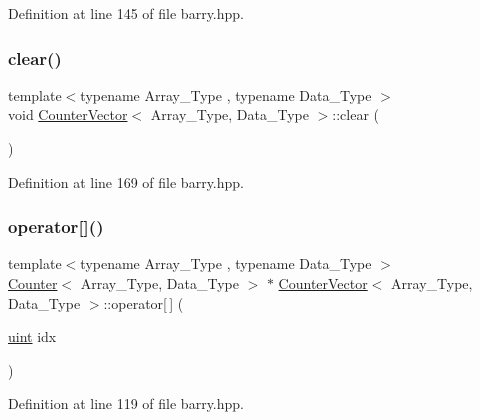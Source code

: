 Definition at line 145 of file barry.\+hpp.

\mbox{\label{classbarry_1_1_counter_vector_acce75748f917e3a7898d49a23df996e7}} 
\subsubsection{\texorpdfstring{clear()}{clear()}}
{\footnotesize\ttfamily template$<$typename Array\+\_\+\+Type , typename Data\+\_\+\+Type $>$ \\
void \hyperlink{classbarry_1_1_counter_vector}{Counter\+Vector}$<$ Array\+\_\+\+Type, Data\+\_\+\+Type $>$\+::clear (\begin{DoxyParamCaption}{ }\end{DoxyParamCaption})\hspace{0.3cm}{\ttfamily [inline]}}



Definition at line 169 of file barry.\+hpp.

\mbox{\label{classbarry_1_1_counter_vector_a6eac3e73298e1e6d424b92f324ffe9a8}} 
\subsubsection{\texorpdfstring{operator[]()}{operator[]()}}
{\footnotesize\ttfamily template$<$typename Array\+\_\+\+Type , typename Data\+\_\+\+Type $>$ \\
\hyperlink{classbarry_1_1_counter}{Counter}$<$ Array\+\_\+\+Type, Data\+\_\+\+Type $>$ $\ast$ \hyperlink{classbarry_1_1_counter_vector}{Counter\+Vector}$<$ Array\+\_\+\+Type, Data\+\_\+\+Type $>$\+::operator\mbox{[}$\,$\mbox{]} (\begin{DoxyParamCaption}\item[{\hyperlink{namespacebarry_a11dfc53ddb4672278319aa04f1e09a6c}{uint}}]{idx }\end{DoxyParamCaption})\hspace{0.3cm}{\ttfamily [inline]}}



Definition at line 119 of file barry.\+hpp.

